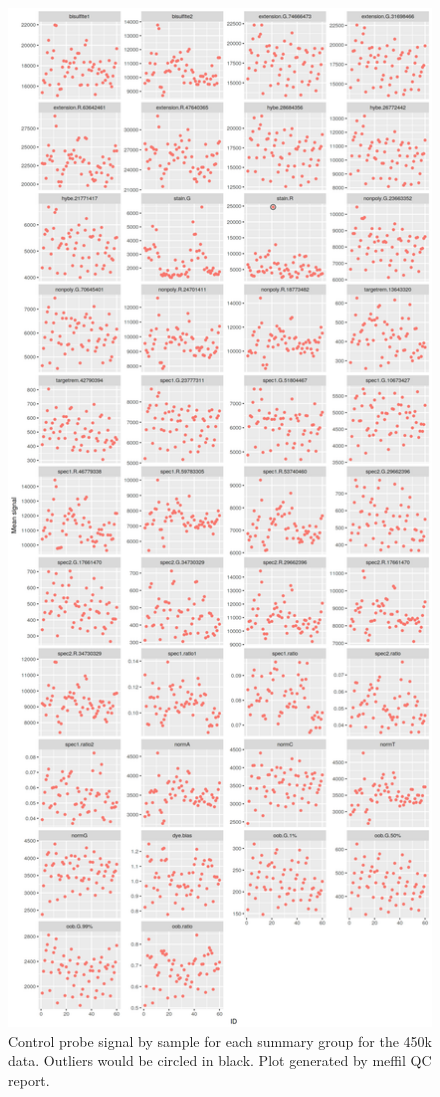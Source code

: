 \documentclass[]{book}
\begin{document}
\begin{figure}

{\centering \includegraphics[width=0.8\linewidth]{figs/MAVIDOSqc450kctrlProbes} 

}

\caption{Control probe signal by sample for each summary group for the 450k data. Outliers would be circled in black. Plot generated by meffil QC report.}\label{fig:MAVIDOSqc450kctrlProbes}
\end{figure}
\end{document}

